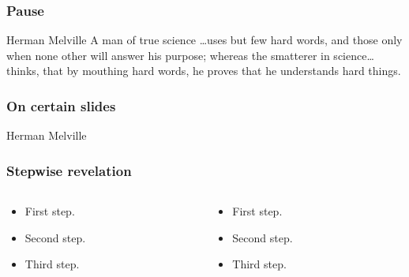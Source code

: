 \documentclass[11pt]{beamer}
\renewcommand{\emph}[1]{\textcolor{magenta}{#1}}
\begin{document}
\begin{frame}
  \frametitle{Pause}
  \begin{block}{Herman Melville}
    A man of true science \ldots \pause uses but few hard
    words, \pause and those only when none other will answer
    his purpose; \pause whereas the smatterer in science\ldots
    \pause thinks, that by mouthing hard words, he proves that
    he understands hard things.
  \end{block}
\end{frame}

\begin{frame}
  \frametitle{On certain slides}
  \begin{block}{Herman Melville}
    \onslide<3>{\emph{He who has never failed somewhere, that
        man can not be great.} }%
  \end{block}
\end{frame}


\begin{frame}
  \frametitle{Stepwise revelation}
  \begin{columns}
    \begin{column}{.5\textwidth}
      \begin{itemize}
      \item<1-> First step.
      \item<2-> Second step.
      \item<3-> Third step.
      \end{itemize}
    \end{column}
    \begin{column}{.5\textwidth}
      \begin{itemize}
      \item<1-> First step.
      \item<2-> Second step.
      \item<3-> Third step.
      \end{itemize}
    \end{column}
  \end{columns}
\end{frame}
\end{document}
